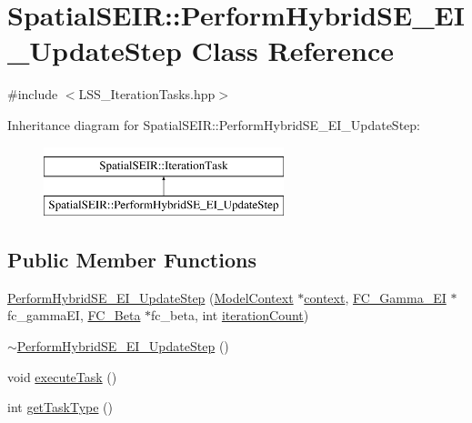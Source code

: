 \hypertarget{classSpatialSEIR_1_1PerformHybridSE__EI__UpdateStep}{\section{Spatial\-S\-E\-I\-R\-:\-:Perform\-Hybrid\-S\-E\-\_\-\-E\-I\-\_\-\-Update\-Step Class Reference}
\label{classSpatialSEIR_1_1PerformHybridSE__EI__UpdateStep}
}


{\ttfamily \#include $<$L\-S\-S\-\_\-\-Iteration\-Tasks.\-hpp$>$}

Inheritance diagram for Spatial\-S\-E\-I\-R\-:\-:Perform\-Hybrid\-S\-E\-\_\-\-E\-I\-\_\-\-Update\-Step\-:\begin{figure}[H]
\begin{center}
\leavevmode
\includegraphics[height=2.000000cm]{classSpatialSEIR_1_1PerformHybridSE__EI__UpdateStep}
\end{center}
\end{figure}
\subsection*{Public Member Functions}
\begin{DoxyCompactItemize}
\item 
\hyperlink{classSpatialSEIR_1_1PerformHybridSE__EI__UpdateStep_a4916ca2382b89ba23441da1c51715d59}{Perform\-Hybrid\-S\-E\-\_\-\-E\-I\-\_\-\-Update\-Step} (\hyperlink{classSpatialSEIR_1_1ModelContext}{Model\-Context} $\ast$\hyperlink{classSpatialSEIR_1_1PerformHybridSE__EI__UpdateStep_a94eb8f51d2429aab817816ce7ebaf511}{context}, \hyperlink{classSpatialSEIR_1_1FC__Gamma__EI}{F\-C\-\_\-\-Gamma\-\_\-\-E\-I} $\ast$fc\-\_\-gamma\-E\-I, \hyperlink{classSpatialSEIR_1_1FC__Beta}{F\-C\-\_\-\-Beta} $\ast$fc\-\_\-beta, int \hyperlink{classSpatialSEIR_1_1PerformHybridSE__EI__UpdateStep_adba72b268c525551ffd68721cfe766e1}{iteration\-Count})
\item 
\hyperlink{classSpatialSEIR_1_1PerformHybridSE__EI__UpdateStep_a0c6d29ffa4d6e6e755a0e000140fdbcf}{$\sim$\-Perform\-Hybrid\-S\-E\-\_\-\-E\-I\-\_\-\-Update\-Step} ()
\item 
void \hyperlink{classSpatialSEIR_1_1PerformHybridSE__EI__UpdateStep_af4f28e1f994de584711e2878eb60afe3}{execute\-Task} ()
\item 
int \hyperlink{classSpatialSEIR_1_1PerformHybridSE__EI__UpdateStep_adc6e6e6e9c1121b3d5a38910d7f2731e}{get\-Task\-Type} ()
\end{DoxyCompactItemize}
